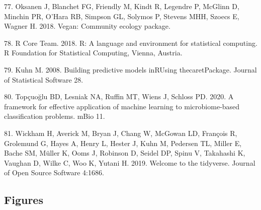 \documentclass[11pt,]{article}
\begin{document}
\hypertarget{ref-Vegan2018}{}
77. Oksanen J, Blanchet FG, Friendly M, Kindt R, Legendre P, McGlinn D,
Minchin PR, O'Hara RB, Simpson GL, Solymos P, Stevens MHH, Szoecs E,
Wagner H. 2018. Vegan: Community ecology package.

\hypertarget{ref-r_citation_2018}{}
78. R Core Team. 2018. R: A language and environment for statistical
computing. R Foundation for Statistical Computing, Vienna, Austria.

\hypertarget{ref-Kuhn2008}{}
79. Kuhn M. 2008. Building predictive models inRUsing thecaretPackage.
Journal of Statistical Software 28.

\hypertarget{ref-Topcuoglu2020}{}
80. Topçuoğlu BD, Lesniak NA, Ruffin MT, Wiens J, Schloss PD. 2020. A
framework for effective application of machine learning to
microbiome-based classification problems. mBio 11.

\hypertarget{ref-Tidyverse2019}{}
81. Wickham H, Averick M, Bryan J, Chang W, McGowan LD, François R,
Grolemund G, Hayes A, Henry L, Hester J, Kuhn M, Pedersen TL, Miller E,
Bache SM, Müller K, Ooms J, Robinson D, Seidel DP, Spinu V, Takahashi K,
Vaughan D, Wilke C, Woo K, Yutani H. 2019. Welcome to the tidyverse.
Journal of Open Source Software 4:1686.

\newpage

\subsection{Figures}\label{figures}
\end{document}
